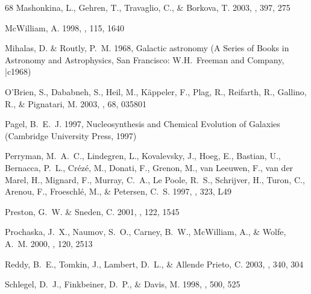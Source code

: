 \documentclass[12pt,preprint]{aastex}
\begin{document}
{\begin{thebibliography}{68}
{Mashonkina}, L., {Gehren}, T., {Travaglio}, C., \& {Borkova}, T. 2003, \aap,
  397, 275

{McWilliam}, A. 1998, \aj, 115, 1640

{Mihalas}, D. \& {Routly}, P.~M. 1968, {Galactic astronomy} (A Series of Books
  in Astronomy and Astrophysics, San Francisco: W.H.~Freeman and Company,
  |c1968)

{O'Brien}, S., {Dababneh}, S., {Heil}, M., {K{\" a}ppeler}, F., {Plag}, R.,
  {Reifarth}, R., {Gallino}, R., \& {Pignatari}, M. 2003, \prc, 68, 035801

{Pagel}, B.~E.~J. 1997, {Nucleosynthesis and Chemical Evolution of Galaxies}
  (Cambridge University Press, 1997)

{Perryman}, M.~A.~C., {Lindegren}, L., {Kovalevsky}, J., {Hoeg}, E., {Bastian},
  U., {Bernacca}, P.~L., {Cr{\' e}z{\' e}}, M., {Donati}, F., {Grenon}, M.,
  {van Leeuwen}, F., {van der Marel}, H., {Mignard}, F., {Murray}, C.~A., {Le
  Poole}, R.~S., {Schrijver}, H., {Turon}, C., {Arenou}, F., {Froeschl{\' e}},
  M., \& {Petersen}, C.~S. 1997, \aap, 323, L49

{Preston}, G.~W. \& {Sneden}, C. 2001, \aj, 122, 1545

{Prochaska}, J.~X., {Naumov}, S.~O., {Carney}, B.~W., {McWilliam}, A., \&
  {Wolfe}, A.~M. 2000, \aj, 120, 2513

{Reddy}, B.~E., {Tomkin}, J., {Lambert}, D.~L., \& {Allende Prieto}, C. 2003,
  \mnras, 340, 304

{Schlegel}, D.~J., {Finkbeiner}, D.~P., \& {Davis}, M. 1998, \apj, 500, 525


\end{thebibliography}}
\end{document}
